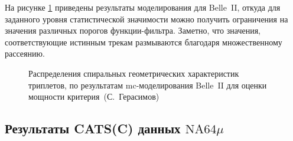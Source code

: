 На рисунке \ref{fig:belle-ii-catsc} приведены результаты моделирования
для Belle~II, откуда для заданного уровня статистической значимости можно получить
ограничения на значения различных порогов функции-фильтра.
Заметно, что значения, соответствующие истинным трекам размываются благодаря множественному рассеянию.

\begin{figure}
    \caption{Распределения спиральных геометрических характеристик триплетов,
    по результатам \acrshort{mc}-моделирования
    Belle~II для оценки мощности критерия~(С.~Герасимов)}
    \label{fig:belle-ii-catsc}
\end{figure}

\subsection{Результаты CATS(C) данных $\text{NA64}\mu$}

